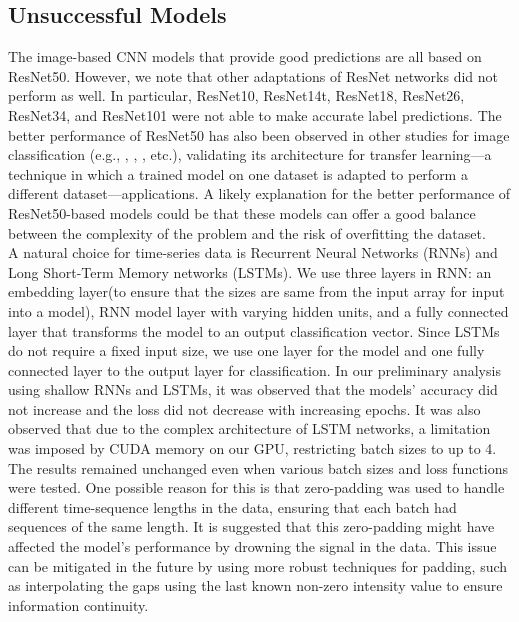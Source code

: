 \subsection{Unsuccessful Models} \label{subsec:unsucessful_models}
The image-based CNN models that provide good predictions are all based on ResNet50. However, we note that other adaptations of ResNet networks did not perform as well. In particular, ResNet10, ResNet14t, ResNet18, ResNet26, ResNet34, and ResNet101 were not able to make accurate label predictions. The better performance of ResNet50 has also been observed in other studies for image classification (e.g., \citet{sharma2018analysis}, \citet{reddy2019transfer}, \citet{shabbir2021satellite}, etc.), validating its architecture for transfer learning---a technique in which a trained model on one dataset is adapted to perform a different dataset---applications. A likely explanation for the better performance of ResNet50-based models could be that these models can offer a good balance between the complexity of the problem and the risk of overfitting the dataset. \\

A natural choice for time-series data is Recurrent Neural Networks (RNNs) and Long Short-Term Memory networks (LSTMs). We use three layers in RNN: an embedding layer(to ensure that the sizes are same from the input array for input into a model), RNN model layer with varying hidden units, and a fully connected layer that transforms the model to an output classification vector. Since LSTMs do not require a fixed input size, we use one layer for the model and one fully connected layer to the output layer for classification.  In our preliminary analysis using shallow RNNs and LSTMs, it was observed that the models' accuracy did not increase and the loss did not decrease with increasing epochs. It was also observed that due to the complex architecture of LSTM networks, a limitation was imposed by CUDA memory on our GPU, restricting batch sizes to up to 4. The results remained unchanged even when various batch sizes and loss functions were tested. One possible reason for this is that zero-padding was used to handle different time-sequence lengths in the data, ensuring that each batch had sequences of the same length. It is suggested that this zero-padding might have affected the model’s performance by drowning the signal in the data. This issue can be mitigated in the future by using more robust techniques for padding, such as interpolating the gaps using the last known non-zero intensity value to ensure information continuity.

